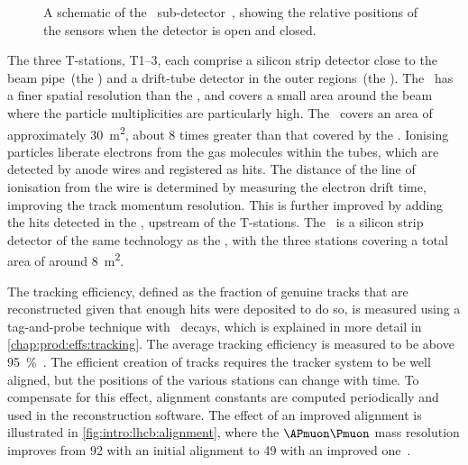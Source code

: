 \begin{figure}
  \centering
  
  \caption{%
    A schematic of the \velo\ sub-detector~\cite{Alves:2008zz}, showing the
    relative positions of the sensors when the detector is open and closed.
  }
  \label{fig:intro:lhcb:velo}
\end{figure}

The three T-stations, T1--3, each comprise a silicon strip detector close to 
the beam pipe~(the \itracker) and a drift-tube detector in the outer 
regions~(the \otracker).
The \itracker\ has a finer spatial resolution than the \otracker, and covers a 
small area around the beam where the particle multiplicities are particularly 
high.
The \otracker\ covers an area of approximately \SI{30}{\metre\squared}, about 8 
times greater than that covered by the \itracker.
Ionising particles liberate electrons from the gas molecules within the tubes, 
which are detected by anode wires and registered as hits.
The distance of the line of ionisation from the wire is determined by measuring 
the electron drift time, improving the track momentum resolution.
This is further improved by adding the hits detected in the \ttracker, upstream 
of the T-stations.
The \ttracker\ is a silicon strip detector of the same technology as the 
\itracker, with the three stations covering a total area of around 
\SI{8}{\metre\squared}.

The tracking efficiency, defined as the fraction of genuine tracks that are 
reconstructed given that enough hits were deposited to do so, is measured using 
a tag-and-probe technique with \JpsiTomumu\ decays, which is explained in more 
detail in \cref{chap:prod:effs:tracking}.
The average tracking efficiency is measured to be above 
\SI{95}{\percent}~\cite{Aaij:2014pwa}.
The efficient creation of tracks requires the tracker system to be well 
aligned, but the positions of the various stations can change with time.
To compensate for this effect, alignment constants are computed periodically 
and used in the reconstruction software.
The effect of an improved alignment is illustrated in 
\cref{fig:intro:lhcb:alignment}, where the $\APmuon\Pmuon$ mass resolution 
improves from \SI{92}{\MeVcc} with an initial alignment to \SI{49}{\MeVcc} with 
an improved one~\cite{Dujany:082010}.

